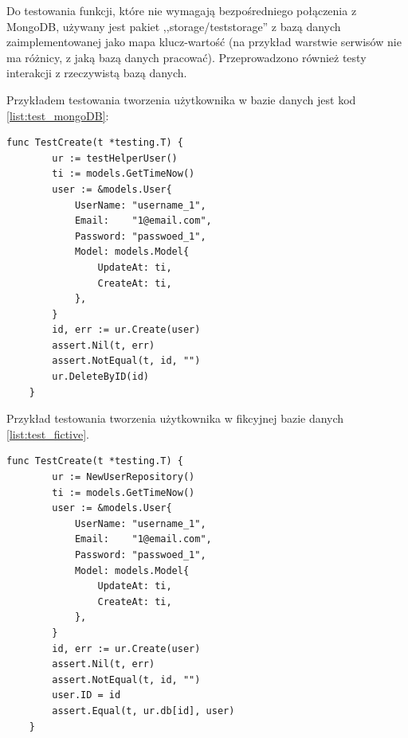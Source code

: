 Do testowania funkcji, które nie wymagają bezpośredniego połączenia z MongoDB, używany jest pakiet ,,storage/teststorage'' z bazą danych zaimplementowanej jako mapa klucz-wartość (na przykład warstwie serwisów nie ma różnicy, z jaką bazą danych pracować). Przeprowadzono również testy interakcji z rzeczywistą bazą danych.

Przykładem testowania tworzenia użytkownika w bazie danych jest kod \ref{list:test_mongoDB}:
\begin{lstlisting}[label=list:test_mongoDB,caption=Kod testowania tworzenia użytkownika w MongoDB,basicstyle=\tiny\ttfamily]
    func TestCreate(t *testing.T) {
        ur := testHelperUser()
        ti := models.GetTimeNow()
        user := &models.User{
            UserName: "username_1",
            Email:    "1@email.com",
            Password: "passwoed_1",
            Model: models.Model{
                UpdateAt: ti,
                CreateAt: ti,
            },
        }
        id, err := ur.Create(user)
        assert.Nil(t, err)
        assert.NotEqual(t, id, "")
        ur.DeleteByID(id)
    }
\end{lstlisting}

Przykład testowania tworzenia użytkownika w fikcyjnej bazie danych \ref{list:test_fictive}.
\begin{lstlisting}[label=list:test_fictive,caption=Kod testowania tworzenia użytkownika w fikcyjnej bazie danych,basicstyle=\tiny\ttfamily]
    func TestCreate(t *testing.T) {
        ur := NewUserRepository()
        ti := models.GetTimeNow()
        user := &models.User{
            UserName: "username_1",
            Email:    "1@email.com",
            Password: "passwoed_1",
            Model: models.Model{
                UpdateAt: ti,
                CreateAt: ti,
            },
        }
        id, err := ur.Create(user)
        assert.Nil(t, err)
        assert.NotEqual(t, id, "")
        user.ID = id
        assert.Equal(t, ur.db[id], user)
    }
\end{lstlisting}

